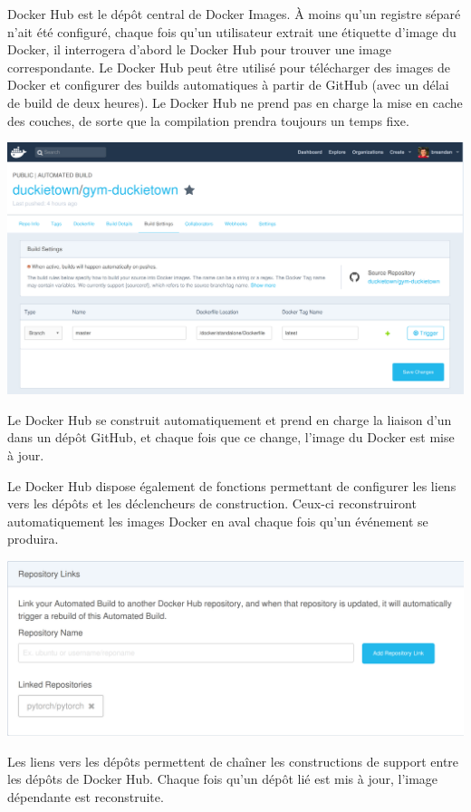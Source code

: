 Docker Hub est le dépôt central de Docker Images. À moins qu'un registre séparé n'ait été configuré, chaque fois qu'un utilisateur extrait une étiquette d'image du Docker, il interrogera d'abord le Docker Hub pour trouver une image correspondante. Le Docker Hub peut être utilisé pour télécharger des images de Docker et configurer des builds automatiques à partir de GitHub (avec un délai de build de deux heures). Le Docker Hub ne prend pas en charge la mise en cache des couches, de sorte que la compilation prendra toujours un temps fixe.
%
\begin{centering}
\includegraphics[width=\textwidth]{../figures/docker_hub_autobuild.png}
\end{centering}
%
Le Docker Hub se construit automatiquement et prend en charge la liaison d'un  dans un dépôt GitHub, et chaque fois que ce  change, l'image du Docker est mise à jour.

Le Docker Hub dispose également de fonctions permettant de configurer les liens vers les dépôts et les déclencheurs de construction. Ceux-ci reconstruiront automatiquement les images Docker en aval chaque fois qu'un événement se produira.\\
%
\begin{centering}
\includegraphics[width=\textwidth]{../figures/docker_hub_repo_links.png}
\end{centering}
%
Les liens vers les dépôts permettent de chaîner les constructions de support entre les dépôts de Docker Hub. Chaque fois qu'un dépôt lié est mis à jour, l'image dépendante est reconstruite.

